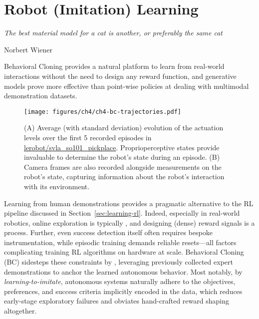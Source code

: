 \section{Robot (Imitation) Learning}
\label{sec:learning-imitation}

\epigraph{\emph{The best material model for a cat is another, or preferably the same cat}}{Norbert Wiener}

\begin{tldr}
Behavioral Cloning provides a natural platform to learn from real-world interactions without the need to design any reward function, and generative models prove more effective than point-wise policies at dealing with multimodal demonstration datasets.
\end{tldr}


% 

\begin{figure}
    \centering
    \texttt{[image: figures/ch4/ch4-bc-trajectories.pdf]}
    \caption{(A) Average (with standard deviation) evolution of the actuation levels over the first 5 recorded episodes in \url{lerobot/svla_so101_pickplace}. Proprioperceptive states provide invaluable to determine the robot's state during an episode. (B) Camera frames are also recorded alongside measurements on the robot's state, capturing information about the robot's interaction with its environment.}
    \label{fig:ch4-bc-trajectories}
\end{figure}

Learning from human demonstrations provides a pragmatic alternative to the RL pipeline discussed in Section~\ref{sec:learning-rl}.
Indeed, especially in real-world robotics, online exploration is typically , and designing (dense) reward signals is a  process.
Further, even success detection itself often requires bespoke instrumentation, while episodic training demands reliable resets---all factors complicating training RL algorithms on hardware at scale.
Behavioral Cloning (BC) sidesteps these constraints by , leveraging previously collected expert demonstrations to anchor the learned autonomous behavior.
Most notably, by \emph{learning-to-imitate}, autonomous systems naturally adhere to the objectives, preferences, and success criteria implicitly encoded in the data, which reduces early-stage exploratory failures and obviates hand-crafted reward shaping altogether.

